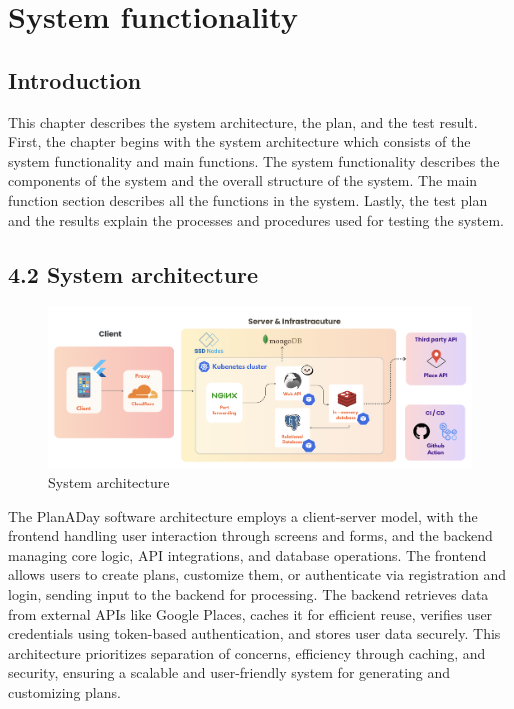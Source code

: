 \chapter{System functionality}
\section{Introduction}
This chapter describes the system architecture, the plan, and the test result. First, the chapter begins with the system architecture which consists of the system functionality and main functions. The system functionality describes the components of the system and the overall structure of the system. The main function section describes all the functions in the system. Lastly, the test plan and the results explain the processes and procedures used for testing the system.
\section{4.2 System architecture}

\begin{figure}[!h]
    \centering
    \includegraphics[width=1\linewidth]{chapter4/sysarch.png}
    \caption{System architecture}
    \label{Figure 4-1. System architecture}
\end{figure}
The PlanADay software architecture employs a client-server model, with the frontend handling user interaction through screens and forms, and the backend managing core logic, API integrations, and database operations. The frontend allows users to create plans, customize them, or authenticate via registration and login, sending input to the backend for processing. The backend retrieves data from external APIs like Google Places, caches it for efficient reuse, verifies user credentials using token-based authentication, and stores user data securely. This architecture prioritizes separation of concerns, efficiency through caching, and security, ensuring a scalable and user-friendly system for generating and customizing plans.

